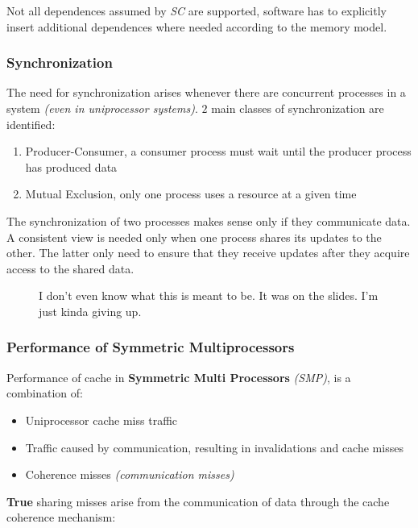 \documentclass[english]{article}
\begin{document}
\bigskip
Not all dependences assumed by \textit{SC} are supported, software has to explicitly insert additional dependences where needed according to the memory model.

\subsubsection{Synchronization}

The need for synchronization arises whenever there are concurrent processes in a system \textit{(even in uniprocessor systems)}.
\(2\) main classes of synchronization are identified:

\begin{enumerate}
  \item Producer-Consumer, a consumer process must wait until the producer process has produced data
  \item Mutual Exclusion, only one process uses a resource at a given time
\end{enumerate}

\bigskip
The synchronization of two processes makes sense only if they communicate data.
A consistent view is needed only when one process shares its updates to the other.
The latter only need to ensure that they receive updates after they acquire access to the shared data.

\begin{figure}[htbp]
  \bigskip
  \centering
  \caption{I don't even know what this is meant to be. It was on the slides. I'm just kinda giving up.}
  \label{fig:i-dont-know}
  \bigskip
\end{figure}

\subsubsection{Performance of Symmetric Multiprocessors}

Performance of cache in \textbf{Symmetric Multi Processors} \textit{(SMP)}, is a combination of:

\begin{itemize}
  \item Uniprocessor cache miss traffic
  \item Traffic caused by communication, resulting in invalidations and cache misses
  \item Coherence misses \textit{(communication misses)}
\end{itemize}

\bigskip
\textbf{True} sharing misses arise from the communication of data through the cache coherence mechanism:
\end{document}
